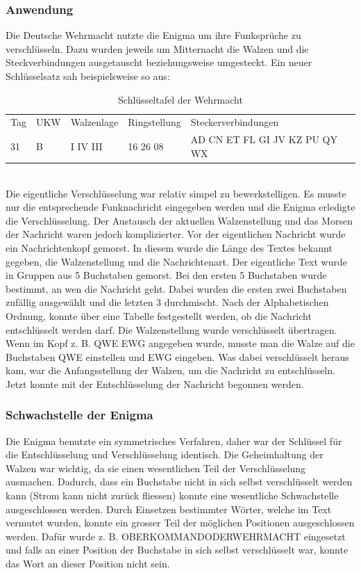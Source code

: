 \subsubsection{Anwendung}
Die Deutsche Wehrmacht nutzte die Enigma um ihre Funksprüche zu verschlüsseln. Dazu wurden jeweils um Mitternacht die Walzen und die Steckverbindungen ausgetauscht beziehungsweise umgesteckt. Ein neuer Schlüsselsatz sah beispielsweise so aus:\\
%
\begin{table}[ht]
\caption{Schlüsseltafel der Wehrmacht}
\begin{center}
\begin{tabular}{|l|l|l|l|l}
Tag & UKW & Walzenlage & Ringstellung &  Steckerverbindungen \\
 31  &   B   &  I   IV III   &    16 26 08   &  AD CN ET FL GI JV KZ PU QY WX \\
\end{tabular}
\end{center}
\end{table}
%
\\
Die eigentliche Verschlüsselung war relativ simpel zu bewerkstelligen. Es musste nur die entsprechende Funknachricht eingegeben werden und die Enigma erledigte die Verschlüsselung. Der Austausch der aktuellen Walzenstellung und das Morsen der Nachricht waren jedoch komplizierter.
%
Vor der eigentlichen Nachricht wurde ein Nachrichtenkopf gemorst. In diesem wurde die Länge des Textes bekannt gegeben, die Walzenstellung und die Nachrichtenart. 
Der eigentliche Text wurde in Gruppen aus 5 Buchstaben gemorst. Bei den ersten 5 Buchstaben wurde bestimmt, an wen die Nachricht geht. Dabei wurden die ersten zwei Buchstaben zufällig ausgewählt und die letzten 3 durchmischt. Nach der Alphabetischen Ordnung, konnte über eine Tabelle festgestellt werden, ob die Nachricht entschlüsselt werden darf.
Die Walzenstellung wurde verschlüsselt übertragen. Wenn im Kopf z. B. QWE EWG angegeben wurde, musste man die Walze auf die Buchstaben QWE einstellen und EWG eingeben. Was dabei verschlüsselt heraus kam, war die Anfangsstellung der Walzen, um die Nachricht zu entschlüsseln. Jetzt konnte mit der Entschlüsselung der Nachricht begonnen werden.
%
\subsubsection{Schwachstelle der Enigma}
Die Enigma benutzte ein symmetrisches Verfahren, daher war der Schlüssel für die Entschlüsselung und Verschlüsselung identisch. %
Die Geheimhaltung der Walzen war wichtig, da sie einen wesentlichen Teil der Verschlüsselung ausmachen.
Dadurch, dass ein Buchstabe nicht in sich selbst verschlüsselt werden kann (Strom kann nicht zurück fliessen) konnte eine wesentliche Schwachstelle ausgeschlossen werden.
Durch Einsetzen bestimmter Wörter, welche im Text vermutet wurden, konnte ein grosser Teil der möglichen Positionen ausgeschlossen werden. Dafür wurde z. B. OBERKOMMANDODERWEHRMACHT eingesetzt und falls an einer Position der Buchstabe in sich selbst verschlüsselt war, konnte das Wort an dieser Position nicht sein.
%
